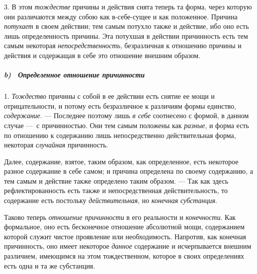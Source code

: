 3. В этом {\em тождестве} причины и действия снята
теперь та форма, через которую они различаются между собою как в-себе-сущее
и как положенное. Причина {\em потухает} в своем
действии; тем самым потухло также и действие, ибо оно есть лишь
определенность причины. Эта потухшая в действии причинность есть тем самым
некоторая {\em непосредственность}, безразличная к
отношению причины и действия и содержащая в себе это отношение внешним
образом.

\subparagraph[b) \ Определенное отношение причинности]{b) \ Определенное
отношение причинности}
1. {\em Тождество} причины с
собой в ее действии есть снятие ее мощи и отрицательности, и потому есть
безразличное к различиям формы единство,
{\em содержание}. — Последнее поэтому лишь
{\em в себе} соотнесено с формой, в данном случае —~с
причинностью. Они тем самым положены как {\em разные},
и форма есть по отношению к содержанию лишь непосредственно действительная
форма, некоторая {\em случайная} причинность.

Далее, содержание, взятое, таким образом, как определенное, есть некоторое
разное содержание в себе самом; и причина определена по своему содержанию,
а тем самым и действие также определено таким образом. — Так как здесь
рефлектированность есть также и непосредственная действительность, то
содержание есть постольку {\em действительная}, но
{\em конечная субстанция}.

Таково теперь {\em отношение причинности} в его
реальности и {\em конечности}. Как формальное, оно есть
бесконечное отношение абсолютной мощи, содержанием которой служит чистое
проявление или необходимость. Напротив, как конечная причинность, оно имеет
некоторое {\em данное} содержание и исчерпывается
внешним различием, имеющимся на этом тождественном, которое в своих
определениях есть одна и та же субстанция.

